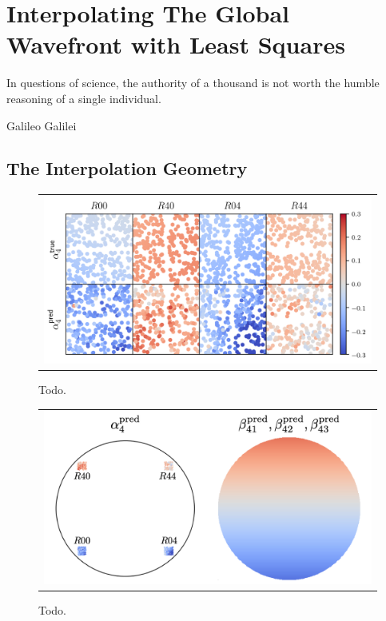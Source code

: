 \chapter{Interpolating The Global Wavefront with Least Squares}
\label{chap:interp}

\epigraph{In questions of science, the authority of a thousand is not worth the humble reasoning of a single individual.}{Galileo Galilei}

\section{The Interpolation Geometry}

\begin{figure}[!htbp]
\begin{center}
\begin{tabular}{c}
\includegraphics[width=\textwidth]{figs/interp/rafts.png}
\end{tabular}
\end{center}
\caption[Todo]{Todo.\label{fig:rafts}}
\end{figure}

\begin{figure}[!htbp]
\begin{center}
\begin{tabular}{c}
\includegraphics[width=\textwidth]{figs/interp/fieldols.png}
\end{tabular}
\end{center}
\caption[Todo]{Todo.\label{fig:ls-intuition}}
\end{figure}

